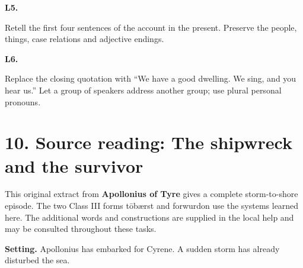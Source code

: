 \par\begin{minipage}{\linewidth}\raggedright
\textbf{L5.}

Retell the first four sentences of the account in the present. Preserve the people, things, case relations and adjective endings.

\end{minipage}\par\addvspace{4pt}

\par\begin{minipage}{\linewidth}\raggedright
\textbf{L6.}

Replace the closing quotation with “We have a good dwelling. We sing, and you hear us.” Let a group of speakers address another group; use plural personal pronouns.

\end{minipage}\par\addvspace{4pt}

\section*{10. Source reading: The shipwreck and the survivor}

This original extract from \textbf{Apollonius of Tyre} gives a complete storm-to-shore episode. The two Class III forms tōbærst and forwurdon use the systems learned here. The additional words and constructions are supplied in the local help and may be consulted throughout these tasks.

\textbf{Setting.} Apollonius has embarked for Cyrene. A sudden storm has already disturbed the sea.

\par\begin{minipage}{\linewidth}\raggedright
{}
\end{minipage}\par

